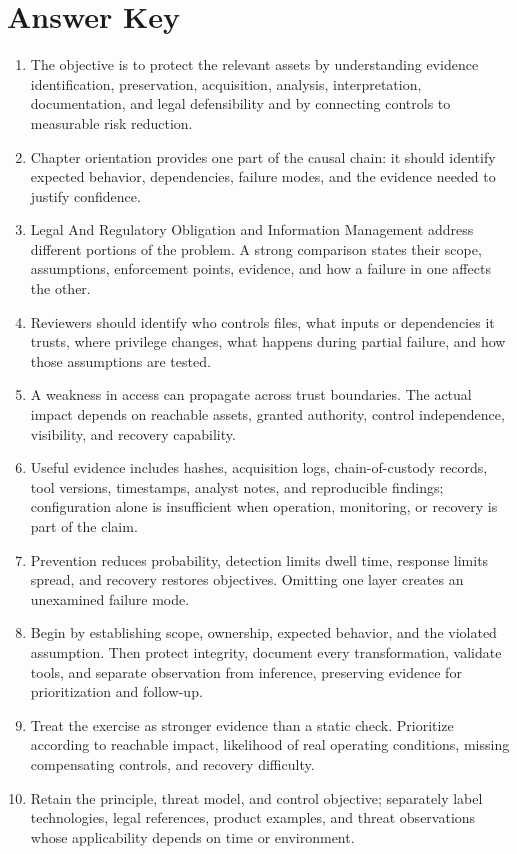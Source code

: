 \documentclass[11pt,letterpaper]{article}
\begin{document}
\section*{Answer Key}
\begin{enumerate}
\item The objective is to protect the relevant assets by understanding evidence identification, preservation, acquisition, analysis, interpretation, documentation, and legal defensibility and by connecting controls to measurable risk reduction.
\item Chapter orientation provides one part of the causal chain: it should identify expected behavior, dependencies, failure modes, and the evidence needed to justify confidence.
\item Legal And Regulatory Obligation and Information Management address different portions of the problem. A strong comparison states their scope, assumptions, enforcement points, evidence, and how a failure in one affects the other.
\item Reviewers should identify who controls files, what inputs or dependencies it trusts, where privilege changes, what happens during partial failure, and how those assumptions are tested.
\item A weakness in access can propagate across trust boundaries. The actual impact depends on reachable assets, granted authority, control independence, visibility, and recovery capability.
\item Useful evidence includes hashes, acquisition logs, chain-of-custody records, tool versions, timestamps, analyst notes, and reproducible findings; configuration alone is insufficient when operation, monitoring, or recovery is part of the claim.
\item Prevention reduces probability, detection limits dwell time, response limits spread, and recovery restores objectives. Omitting one layer creates an unexamined failure mode.
\item Begin by establishing scope, ownership, expected behavior, and the violated assumption. Then protect integrity, document every transformation, validate tools, and separate observation from inference, preserving evidence for prioritization and follow-up.
\item Treat the exercise as stronger evidence than a static check. Prioritize according to reachable impact, likelihood of real operating conditions, missing compensating controls, and recovery difficulty.
\item Retain the principle, threat model, and control objective; separately label technologies, legal references, product examples, and threat observations whose applicability depends on time or environment.
\end{enumerate}
\end{document}
